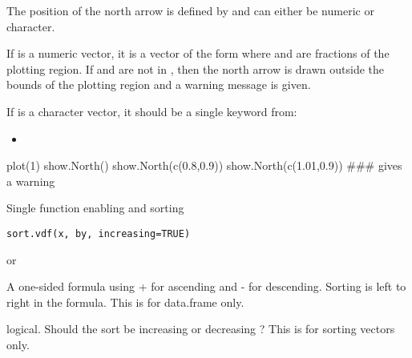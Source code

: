 \documentclass[a4paper]{book}
\begin{document}
%
\begin{Details}\relax
The position of the north arrow is defined by  and can either be numeric or character.

If  is a numeric vector, it is a vector of the form  where  and  are fractions of the plotting region. 
If  and  are not in \eqn{[0, 1]}{}, then the north arrow is drawn outside the bounds of the plotting region 
and a warning message is given.\\{}

If  is a character vector, it should be a single keyword from:
\begin{itemize}

\item {}

\end{itemize}
 

\end{Details}
%
\begin{Examples}
\begin{ExampleCode}
plot(1)
show.North()
show.North(c(0.8,0.9))
show.North(c(1.01,0.9))  ### gives a warning
\end{ExampleCode}
\end{Examples}
\newpage
{}
%
\begin{Description}\relax
Single function enabling  and  sorting
\end{Description}
%
\begin{Usage}
\begin{verbatim}
sort.vdf(x, by, increasing=TRUE)
\end{verbatim}
\end{Usage}
%
\begin{Arguments}
\begin{ldescription}
\item[\code{x}]  or 
\item[\code{by}] A one-sided formula using + for ascending and - for descending. Sorting is left to right in the formula. This is for data.frame only.
\item[\code{increasing}] logical. Should the sort be increasing  or decreasing ? This is for sorting vectors only.

\end{ldescription}
\end{Arguments}
\end{document}
